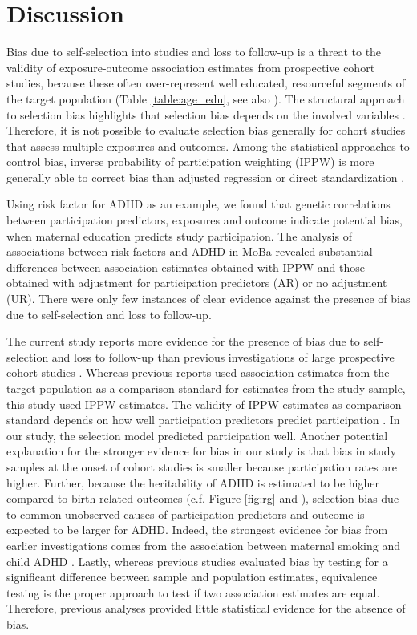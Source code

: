 \documentclass[12pt]{article}
\begin{document}
\section{Discussion}
Bias due to self-selection into studies and loss to follow-up is a threat to the validity of exposure-outcome association estimates from prospective cohort studies, because these often over-represent well educated, resourceful segments of the target population (Table \ref{table:age_edu}, see also \cite{Vinther-Larsen2010-hq, Galea2007-hv, Howe2013-vv}). The structural approach to selection bias highlights that selection bias depends on the involved variables \cite{Hernan2004-oz}. Therefore, it is not possible to evaluate selection bias generally for cohort studies that assess multiple exposures and outcomes. Among the statistical approaches to control bias, inverse probability of participation weighting (IPPW) is more generally able to correct bias than adjusted regression or direct standardization \cite{Hernan2004-oz}.

Using risk factor for ADHD as an example, we found that genetic correlations between participation predictors, exposures and outcome indicate potential bias, when maternal education predicts study participation. The analysis of associations between risk factors and ADHD in MoBa revealed substantial differences between association estimates obtained with IPPW and those obtained with adjustment for participation predictors (AR) or no adjustment (UR). There were only few instances of clear evidence against the presence of bias due to self-selection and loss to follow-up.

The current study reports more evidence for the presence of bias due to self-selection and loss to follow-up than previous investigations of large prospective cohort studies \cite{Nilsen2009-ci, Nohr2006-uf,Greene2011-am, Wolke2009-lu}. Whereas previous reports used association estimates from the target population as a comparison standard for estimates from the study sample, this study used IPPW estimates. The validity of IPPW estimates as comparison standard depends on how well participation predictors predict participation \cite{Seaman2013-rj}. In our study, the selection model predicted participation well. Another potential explanation for the stronger evidence for bias in our study is that bias in study samples at the onset of cohort studies is smaller because participation rates are higher. Further, because the heritability of ADHD is estimated to be higher compared to birth-related outcomes (c.f. Figure \ref{fig:rg} and \cite{Wu2015-bg}), selection bias due to common unobserved causes of participation predictors and outcome is expected to be larger for ADHD. Indeed, the strongest evidence for bias from earlier investigations comes from the association between maternal smoking and child ADHD \cite{Greene2011-am}. Lastly, whereas previous studies evaluated bias by testing for a significant difference between sample and population estimates, equivalence testing \cite{Schuirmann1987-ip, Mascha2011-um} is the proper approach to test if two association estimates are equal. Therefore, previous analyses provided little statistical evidence for the absence of bias. 
\end{document}
